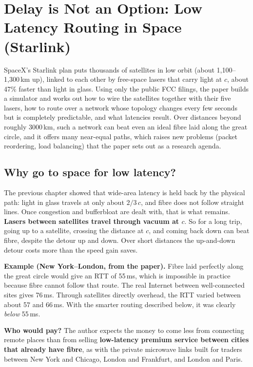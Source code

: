 \chapter{Delay is Not an Option: Low Latency Routing in Space (Starlink)}

\begin{keybox}
SpaceX's Starlink plan puts thousands of satellites in low orbit (about 1,100--1,300\,km up), linked to each other by free-space lasers that carry light at
$c$, about 47\% faster than light in glass. Using only the public FCC filings, the paper builds a simulator and works out how to wire the satellites together
with their five lasers, how to route over a network whose topology changes every few seconds but is completely predictable, and what latencies result. Over
distances beyond roughly 3000\,km, such a network can beat even an ideal fibre laid along the great circle, and it offers many near-equal paths, which raises new
problems (packet reordering, load balancing) that the paper sets out as a research agenda.
\end{keybox}

\section{Why go to space for low latency?}

The previous chapter showed that wide-area latency is held back by the physical path: light in glass travels at only about $2/3\,c$, and fibre does not follow
straight lines. Once congestion and bufferbloat are dealt with, that is what remains. \textbf{Lasers between satellites travel through vacuum at $c$}. So for a
long trip, going up to a satellite, crossing the distance at $c$, and coming back down can beat fibre, despite the detour up and down. Over short distances the
up-and-down detour costs more than the speed gain saves.

\textbf{Example (New York--London, from the paper).} Fibre laid perfectly along the great circle would give an RTT of 55\,ms, which is impossible in practice because
fibre cannot follow that route. The real Internet between well-connected sites gives 76\,ms. Through satellites directly overhead, the RTT varied between about 57 and
66\,ms. With the smarter routing described below, it was clearly \emph{below} 55\,ms.

\textbf{Who would pay?} The author expects the money to come less from connecting remote places than from selling \textbf{low-latency premium service between cities
that already have fibre}, as with the private microwave links built for traders between New York and Chicago, London and Frankfurt, and London and Paris.

